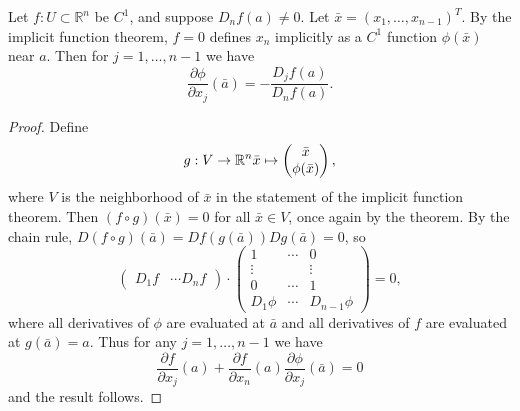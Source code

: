 \documentclass[12pt]{article}
\begin{document}
\begin{lemma}
	Let $f:U\subset\mathbb{R}^n$ be $C^1$, and suppose $D_nf(a)\neq 0$. Let $\bar{x}=(x_1,\dots,x_{n-1})^T$. By the implicit function theorem, $f=0$ defines $x_n$ implicitly as a $C^1$ function $\phi(\bar{x})$ near $a$. Then for $j=1,\dots,n-1$ we have 
	\begin{equation*}
		\frac{\partial \phi}{\partial x_j}(\bar{a}) = -\frac{D_jf(a)}{D_nf(a)}.
	\end{equation*}
\end{lemma}
\begin{proof}
	Define 
	\begin{equation*}
		g: V\to\mathbb{R}^n \\
		\bar{x} \mapsto \begin{pmatrix} \bar{x} \\ \phi(\bar{x}) \end{pmatrix},
	\end{equation*}
	where $V$ is the neighborhood of $\bar{x}$ in the statement of the implicit function theorem. Then $(f\circ g)(\bar{x})=0$ for all $\bar{x}\in V$, once again by the theorem. By the chain rule, $D(f\circ g)(\bar{a})=Df(g(\bar{a}))Dg(\bar{a})=0$, so 
	\begin{equation*}
		\begin{pmatrix} D_1f & \cdots D_nf \end{pmatrix} \cdot \begin{pmatrix} 1 & \cdots & 0 \\ \vdots & & \vdots \\ 0 & \cdots & 1 \\ D_1\phi & \cdots & D_{n-1}\phi \end{pmatrix} = 0,
	\end{equation*}
	where all derivatives of $\phi$ are evaluated at $\bar{a}$ and all derivatives of $f$ are evaluated at $g(\bar{a})=a$. Thus for any $j=1,\dots,n-1$ we have 
	\begin{equation*}
		\frac{\partial f}{\partial x_j}(a) + \frac{\partial f}{\partial x_n}(a)\frac{\partial \phi}{\partial x_j}(\bar{a})=0
	\end{equation*}
	and the result follows.
\end{proof}
\end{document}
